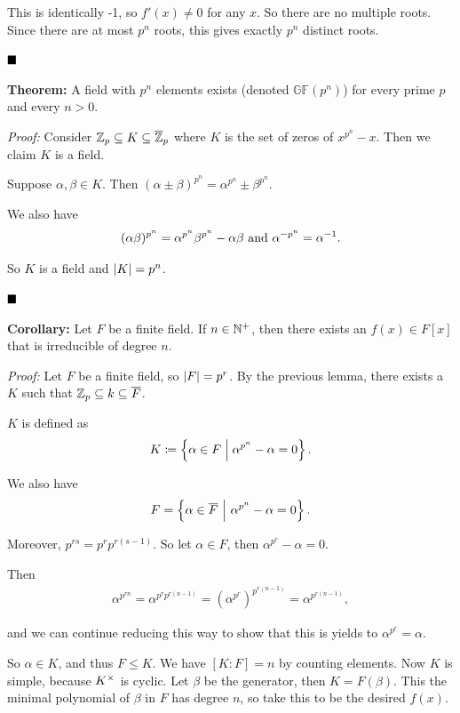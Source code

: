 This is identically -1, so \(f'(x) \neq 0\) for any \(x\). So there are
no multiple roots. Since there are at most \(p^n\) roots, this gives
exactly \(p^n\) distinct roots.

\(\qed\)

\textbf{Theorem:} A field with \(p^n\) elements exists (denoted
\(\mathbb{GF}(p^n)\)) for every prime \(p\) and every \(n > 0\).

\emph{Proof:} Consider \({\mathbb{Z}}_p \subseteq K \subseteq \overline{{\mathbb{Z}}}_p\)
where \(K\) is the set of zeros of \(x^{p^n}-x\). Then we claim \(K\) is
a field.

Suppose \(\alpha, \beta \in K\). Then
\((\alpha \pm \beta)^{p^n} = \alpha^{p^n} \pm \beta^{p^n}\).

We also have
\begin{align*}
(\alpha\beta)^{p^n} = \alpha^{p^n}\beta^{p^n} - \alpha\beta
\text{ and }
\alpha^{-p^n} = \alpha^{-1}
.\end{align*}

So \(K\) is a field and \({\left\lvert {K} \right\rvert} = p^n\).

\(\qed\)

\textbf{Corollary:} Let \(F\) be a finite field. If \(n\in{\mathbb{N}}^+\), then
there exists an \(f(x) \in F[x]\) that is irreducible of degree \(n\).

\emph{Proof:} Let \(F\) be a finite field, so \({\left\lvert {F} \right\rvert} = p^r\). By the
previous lemma, there exists a \(K\) such that
\({\mathbb{Z}}_p \subseteq k \subseteq \overline F\).

\(K\) is defined as
\begin{align*}
K \coloneqq \left\{{\alpha \in F \mathrel{\Big|} \alpha^{p^n} - \alpha = 0}\right\}
.\end{align*}

We also have
\begin{align*}
F  = \left\{{\alpha \in \overline F {~\mathrel{\Big|}~} \alpha^{p^n} - \alpha = 0}\right\}.\end{align*}

Moreover, \(p^{rs} = p^r p^{r(s-1)}\). So let \(\alpha \in F\), then
\(\alpha^{p^r} - \alpha = 0\).

Then
\begin{align*}
\alpha^{p^{rn}} = \alpha^{p^r p^{r(n-1)}} = (\alpha^{p^r})^{p^{r(n-1)}} = \alpha^{p^{r(n-1)}}
,\end{align*}

and we can continue reducing this way to show that this is yields to
\(\alpha^{p^r} = \alpha\).

So \(\alpha \in K\), and thus \(F \leq K\). We have \([K:F] = n\) by
counting elements. Now \(K\) is simple, because \(K^{\times}\) is cyclic.
Let \(\beta\) be the generator, then \(K = F(\beta)\). This the minimal
polynomial of \(\beta\) in \(F\) has degree \(n\), so take this to be
the desired \(f(x)\).

